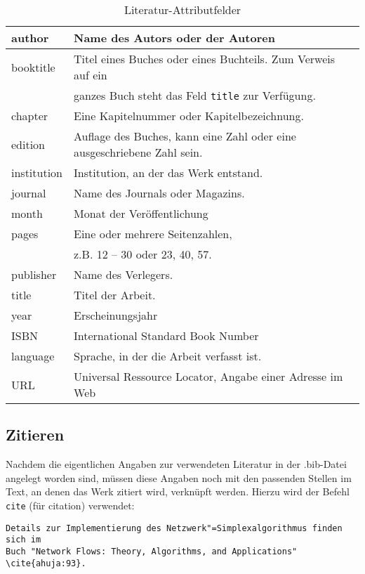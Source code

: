 \begin{table}[H]
		\begin{tabular}{|l|l|}
			\hline
			author & Name des Autors oder der Autoren\\
			\hline
			booktitle & Titel eines Buches oder eines Buchteils. Zum Verweis auf ein\\
								& ganzes Buch steht das Feld \texttt{title} zur Verfügung.\\
			\hline
			chapter & Eine Kapitelnummer oder Kapitelbezeichnung.\\
			\hline
			edition & Auflage des Buches, kann eine Zahl oder eine ausgeschriebene Zahl sein.\\
			\hline
			institution & Institution, an der das Werk entstand.\\
			\hline
			journal & Name des Journals oder Magazins.\\
			\hline
			month & Monat der Veröffentlichung\\
			\hline
			pages & Eine oder mehrere Seitenzahlen,\\
						& z.B. 12 -- 30 oder 23, 40, 57.\\
			\hline
			publisher & Name des Verlegers.\\
			\hline
			title & Titel der Arbeit.\\
			\hline
			year & Erscheinungsjahr\\
			\hline
			ISBN & International Standard Book Number\\
			\hline
			language & Sprache, in der die Arbeit verfasst ist.\\
			\hline
			URL & Universal Ressource Locator, Angabe einer Adresse im Web \\			
			\hline
		\end{tabular}
	\caption{Literatur-Attributfelder}
\end{table}

\subsection*{Zitieren} 

Nachdem die eigentlichen Angaben zur verwendeten Literatur in der .bib-Datei angelegt worden sind, müssen diese Angaben noch mit den passenden Stellen im Text, an denen das Werk zitiert wird, verknüpft werden. Hierzu wird der Befehl \texttt{cite{}} (für citation) verwendet:
{\small\begin{verbatim}
Details zur Implementierung des Netzwerk"=Simplexalgorithmus finden sich im 
Buch "Network Flows: Theory, Algorithms, and Applications" \cite{ahuja:93}.
\end{verbatim}}

